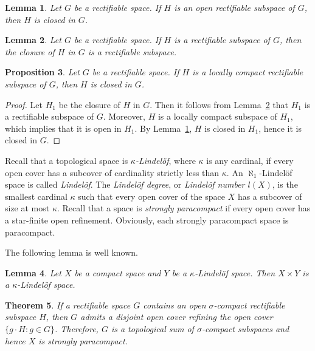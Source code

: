 \documentclass[psamsfonts,fceqn,leqno]{amsart}
\newtheorem{theorem}{Theorem}[section]
\newtheorem{proposition}[theorem]{Proposition}
\newtheorem{lemma}[theorem]{Lemma}
\theoremstyle{definition}
\begin{document}
\begin{lemma}\cite{LLL}\label{l1}
Let $G$ be a rectifiable space. If $H$ is an open rectifiable subspace of $G$, then $H$ is closed in $G$.
\end{lemma}

\begin{lemma}\cite{LLL}\label{l2}
Let $G$ be a rectifiable space. If $H$ is a rectifiable subspace of $G$, then the closure of $H$ in $G$  is a rectifiable subspace.
\end{lemma}

\begin{proposition}
Let $G$ be a rectifiable space. If $H$ is a locally compact rectifiable subspace of $G$, then $H$ is closed in $G$.
\end{proposition}

\begin{proof}
Let $H_{1}$ be the closure of $H$ in $G$. Then it follows from Lemma~\ref{l2} that $H_{1}$ is a rectifiable subspace of $G$. Moreover, $H$ is a locally compact subspace of $H_{1}$, which implies that it is open in $H_{1}$. By Lemma~\ref{l1}, $H$ is closed in $H_{1}$, hence it is closed in $G$.
\end{proof}

Recall that a topological space is {\it $\kappa$-Lindel\"{o}f}, where $\kappa$ is any cardinal, if every open cover has a subcover of cardinality strictly less than $\kappa$.
An $\aleph_{1}$-Lindel\"{o}f space is called {\it Lindel\"{o}f}.
The {\it Lindel\"{o}f degree}, or {\it Lindel\"{o}f number $l(X)$}, is the smallest cardinal $\kappa$ such that every open cover of the space $X$ has a subcover of size at most $\kappa$.
Recall that a space is {\it strongly paracompact}
if every open cover has a star-finite open refinement. Obviously, each strongly paracompact space is paracompact.

The following lemma is well known.

\begin{lemma}\label{p1}
Let $X$ be a compact space and $Y$ be a $\kappa$-Lindel\"{o}f space. Then $X\times Y$ is a $\kappa$-Lindel\"{o}f space.
\end{lemma}

\begin{theorem}\label{t1}
If a rectifiable space $G$ contains an open $\sigma$-compact rectifiable subspace $H$, then $G$ admits a disjoint open cover refining the open cover $\{g\cdot H: g\in G\}$. Therefore, $G$ is a topological sum of $\sigma$-compact subspaces and hence $X$ is strongly paracompact.
\end{theorem}
\end{document}

